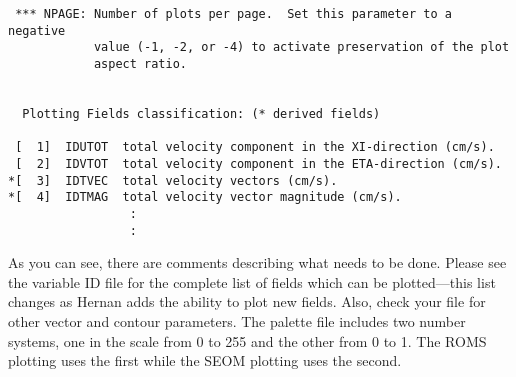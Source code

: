 \begin{verbatim}
 *** NPAGE: Number of plots per page.  Set this parameter to a negative
            value (-1, -2, or -4) to activate preservation of the plot
            aspect ratio.


  Plotting Fields classification: (* derived fields)

 [  1]  IDUTOT  total velocity component in the XI-direction (cm/s).
 [  2]  IDVTOT  total velocity component in the ETA-direction (cm/s).
*[  3]  IDTVEC  total velocity vectors (cm/s).
*[  4]  IDTMAG  total velocity vector magnitude (cm/s).
                 :
                 :
\end{verbatim}
As you can see, there are comments describing what needs to be
done.  Please see the variable ID file for the complete list of fields
which can be plotted---this list changes as Hernan adds the ability to
plot new fields. Also, check your  file for other
vector and contour parameters. The palette file includes two number
systems, one in the scale from 0 to 255 and the other from 0 to 1.
The ROMS plotting uses the first while the SEOM plotting uses the second.
